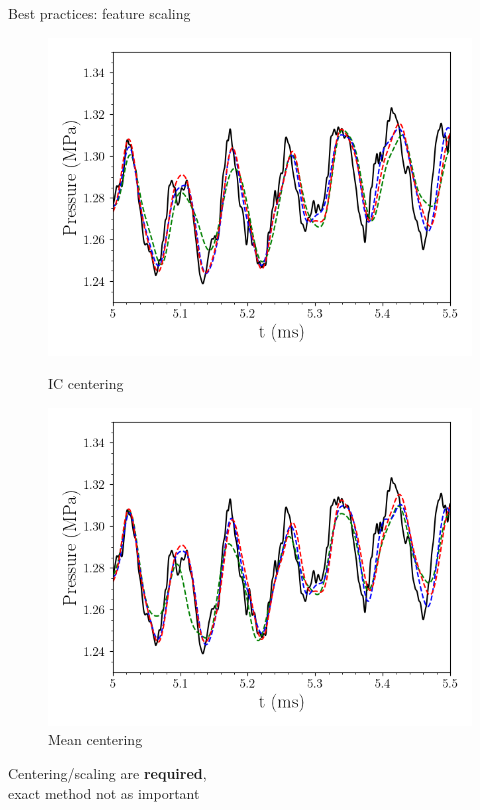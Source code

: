 \documentclass[]{beamer}
\begin{document}
\begin{frame}{Best practices: feature scaling}
\begin{figure}
{\begin{minipage}{0.32\linewidth}
				\includegraphics[width=0.99\linewidth]{Images/experiments/cvrc/best_pract/pressure_probe_centScale_centIC.png}
				\caption*{IC centering}
			\end{minipage}
			\begin{minipage}{0.32\linewidth}
				\includegraphics[width=0.99\linewidth]{Images/experiments/cvrc/best_pract/pressure_probe_centScale_centMean.png}
				\caption*{Mean centering}
			\end{minipage}
		}
	\end{figure}
	\begin{tcolorbox}[colframe=blue!50!white,halign=center]
		Centering/scaling are \textbf{required}, \\
		exact method not as important
	\end{tcolorbox}
\end{frame}
\end{document}
